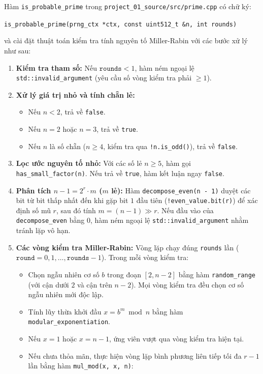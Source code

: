 Hàm \texttt{is\_probable\_prime} trong \texttt{project\_01\_source/\allowbreak src/prime.cpp} có chữ ký:
\begin{center}
\texttt{is\_probable\_prime(prng\_ctx *ctx, const uint512\_t \&n, int rounds)}
\end{center}
\noindent và cài đặt thuật toán kiểm tra tính nguyên tố Miller-Rabin với các bước xử lý như sau:
\begin{enumerate}
    \item \textbf{Kiểm tra tham số:} Nếu $\texttt{rounds} < 1$, hàm ném ngoại lệ \texttt{std::invalid\_argument} (yêu cầu số vòng kiểm tra phải $\ge 1$).
    \item \textbf{Xử lý giá trị nhỏ và tính chẵn lẻ:}
    \begin{itemize}
        \item Nếu $n < 2$, trả về \texttt{false}.
        \item Nếu $n = 2$ hoặc $n = 3$, trả về \texttt{true}.
        \item Nếu $n$ là số chẵn ($n \ge 4$, kiểm tra qua \texttt{!n.is\_odd()}), trả về \texttt{false}.
    \end{itemize}
    \item \textbf{Lọc ước nguyên tố nhỏ:} Với các số lẻ $n \ge 5$, hàm gọi \texttt{has\_small\_factor(n)}. Nếu trả về \texttt{true}, hàm kết luận ngay \texttt{false}.
    \item \textbf{Phân tích $n - 1 = 2^r \cdot m$ ($m$ lẻ):} Hàm \texttt{decompose\_even(n - 1)} duyệt các bit từ bit thấp nhất đến khi gặp bit $1$ đầu tiên (\texttt{!even\_value.bit(r)}) để xác định số mũ $r$, sau đó tính $m = (n - 1) \gg r$. Nếu đầu vào của \texttt{decompose\_even} bằng $0$, hàm ném ngoại lệ \texttt{std::invalid\_argument} nhằm tránh lặp vô hạn.
    \item \textbf{Các vòng kiểm tra Miller-Rabin:} Vòng lặp chạy đúng \texttt{rounds} lần ($\texttt{round} = 0, 1, \dots, \texttt{rounds} - 1$). Trong mỗi vòng kiểm tra:
    \begin{itemize}
        \item Chọn ngẫu nhiên cơ số $b$ trong đoạn $[2, n - 2]$ bằng hàm \texttt{random\_range} (với cận dưới $2$ và cận trên $n - 2$). Mọi vòng kiểm tra đều chọn cơ số ngẫu nhiên mới độc lập.
        \item Tính lũy thừa khởi đầu $x = b^m \bmod n$ bằng hàm \texttt{modular\_exponentiation}.
        \item Nếu $x = 1$ hoặc $x = n - 1$, ứng viên vượt qua vòng kiểm tra hiện tại.
        \item Nếu chưa thỏa mãn, thực hiện vòng lặp bình phương liên tiếp tối đa $r - 1$ lần bằng hàm \texttt{mul\_mod(x, x, n)}:

\end{itemize}
\end{enumerate}
